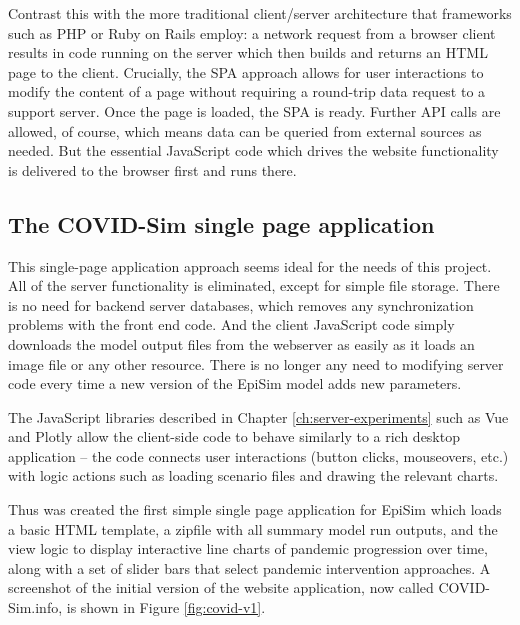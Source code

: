 Contrast this with the more traditional client/server architecture that frameworks such as PHP or Ruby on Rails employ: a network request from a browser client results in code running on the server which then builds and returns an HTML page to the client. Crucially, the SPA approach allows for user interactions to modify the content of a page without requiring a round-trip data request to a support server. Once the page is loaded, the SPA is ready. Further API calls are allowed, of course, which means data can be queried from external sources as needed. But the essential JavaScript code which drives the website functionality is delivered to the browser first and runs there.

\hypertarget{covid-single-page-application}{%
\subsection{The COVID-Sim single page application}\label{covid-single-page-application}}

This single-page application approach seems ideal for the needs of this project. All of the server functionality is eliminated, except for simple file storage. There is no need for backend server databases, which removes any synchronization problems with the front end code. And the client JavaScript code simply downloads the model output files from the webserver as easily as it loads an image file or any other resource. There is no longer any need to modifying server code every time a new version of the EpiSim model adds new parameters.

The JavaScript libraries described in Chapter \ref{ch:server-experiments} such as Vue and Plotly allow the client-side code to behave similarly to a rich desktop application -- the code connects user interactions (button clicks, mouseovers, etc.) with logic actions such as loading scenario files and drawing the relevant charts.

Thus was created the first simple single page application for EpiSim which loads a basic HTML template, a zipfile with all summary model run outputs, and the view logic to display interactive line charts of pandemic progression over time, along with a set of slider bars that select pandemic intervention approaches. A screenshot of the initial version of the website application, now called COVID-Sim.info, is shown in Figure \ref{fig:covid-v1}.

